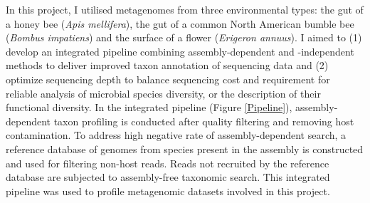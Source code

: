 \documentclass[11pt]{article}
\begin{document}
  \newline
  In this project, I utilised metagenomes from three environmental types: the gut of a honey bee (\textit{Apis mellifera}), the gut of a common North American bumble bee (\textit{Bombus impatiens}) and the surface of a flower (\textit{Erigeron annuus}). 
  I aimed to (1) develop an integrated pipeline combining assembly-dependent and -independent methods to deliver improved taxon annotation of sequencing data and (2) optimize sequencing depth to balance sequencing cost and requirement for reliable analysis of microbial species diversity, or the description of their functional diversity. 
  In the integrated pipeline (Figure \ref{Pipeline}), 
  assembly-dependent taxon profiling is conducted after quality filtering and removing host contamination. 
  To address high negative rate of assembly-dependent search, a reference database of genomes from species present in the assembly is constructed and used for filtering non-host reads. 
  Reads not recruited by the reference database are subjected to assembly-free taxonomic search. 
  This integrated pipeline was used to profile metagenomic datasets involved in this project. 
\end{document}
